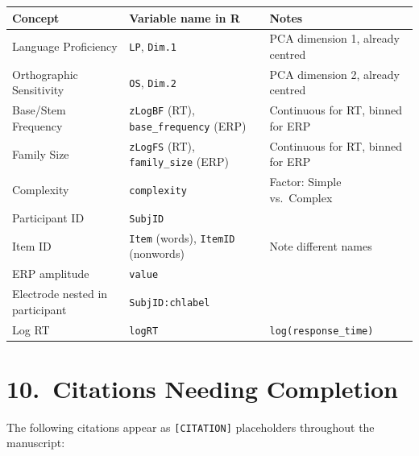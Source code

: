 \documentclass[11pt, a4paper]{article}
\begin{document}
\begin{center}
\begin{tabular}{p{4.2cm} p{5.8cm} p{4.5cm}}
  \toprule
  \textbf{Concept} & \textbf{Variable name in R} & \textbf{Notes} \\
  \midrule
  Language Proficiency     & \texttt{LP}, \texttt{Dim.1}      & PCA dimension 1, already centred \\[2pt]
  Orthographic Sensitivity & \texttt{OS}, \texttt{Dim.2}      & PCA dimension 2, already centred \\[2pt]
  Base/Stem Frequency      & \texttt{zLogBF} (RT), \texttt{base\_frequency} (ERP) & Continuous for RT, binned for ERP \\[2pt]
  Family Size              & \texttt{zLogFS} (RT), \texttt{family\_size} (ERP)    & Continuous for RT, binned for ERP \\[2pt]
  Complexity               & \texttt{complexity}              & Factor: Simple vs.\ Complex \\[2pt]
  Participant ID           & \texttt{SubjID}                  & \\[2pt]
  Item ID                  & \texttt{Item} (words), \texttt{ItemID} (nonwords) & Note different names \\[2pt]
  ERP amplitude            & \texttt{value}                   & \\[2pt]
  Electrode nested in participant & \texttt{SubjID:chlabel}   & \\[2pt]
  Log RT                   & \texttt{logRT}                   & \texttt{log(response\_time)} \\
  \bottomrule
\end{tabular}
\end{center}

\section{10.\ Citations Needing Completion}

The following citations appear as \texttt{[CITATION]} placeholders throughout the manuscript:
\end{document}
